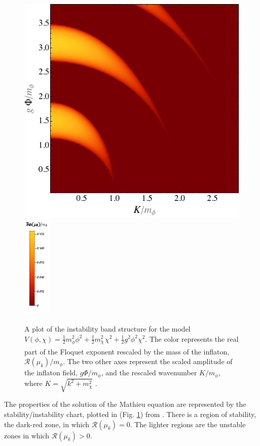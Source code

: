 \documentclass[11pt,a4paper,twoside]{book}
\begin{document}
\begin{figure}
	\centering
	\includegraphics[width=0.6\linewidth, height=0.4\textheight]{Images/Chap4/AminHertzberg_MathieuChart}
	\includegraphics[width=0.15\linewidth, height=0.4\textheight]{Images/Chap4/MathieuChart_Legend}	
	\caption{A plot of the instability band structure for the model $ V(\phi, \chi)=\frac{1}{2}m^{2}_{\phi}\phi^{2} + \frac{1}{2}m^{2}_{\chi_{_{_{}}}}\chi^{2} + \frac{1}{2}g^{2}\phi^{2}\chi^{2} $. The color represents the real part of the Floquet exponent rescaled by the mass of the inflaton, $ \mathcal{R}(\mu_{k})/m_{\phi} $. The two other axes represent the scaled amplitude of the inflaton field, $ g\Phi/m_{\phi} $, and the rescaled wavenumber $ K/m_{\phi} $, where $ K=\sqrt{k^{2} + m^{2}_{\chi}} $ \cite{Chap4:AminHetrzberg}.}
	\label{fig:mathieuchartlegend}
\end{figure}
The properties of the solution of the Mathieu equation are represented by the stability/instability chart, plotted in (Fig. \ref{fig:mathieuchartlegend}) from \cite{Chap4:AminHetrzberg}. There is a region of stability, the dark-red zone, in which $\mathcal{R}(\mu_{k})=0$. The lighter regions are the  unstable zones in which $\mathcal{R}(\mu_{k})>0$. 
\end{document}
